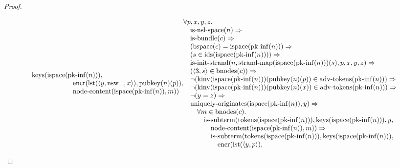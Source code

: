 \documentclass[11pt]{article}
\theoremstyle{plain}
\begin{document}
\begin{proof}
\begin{itemize}[leftmargin=2.8em, itemsep=4pt, parsep=1pt]
\begin{itemize}[leftmargin=2.8em, itemsep=4pt, parsep=1pt]
\begin{equation*}
\begin{array}{@{}l@{}}
\operatorname{keys}(\operatorname{ispace}(\operatorname{pk\text{-}inf}(n))), \\ \quad \quad \quad \quad \quad \quad \operatorname{encr}(\operatorname{lst}(\langle y, \operatorname{nsw\_}, x \rangle), \operatorname{pubkey}(n)(p)), \\ \quad \quad \quad \quad \quad \quad \operatorname{node\text{-}content}(\operatorname{ispace}(\operatorname{pk\text{-}inf}(n)), m)) \end{array} \\
\begin{array}{@{}l@{}} \forall p, x, y, z. \\ \quad \operatorname{is\text{-}nsl\text{-}space}(n) \Rightarrow  \\ \quad \operatorname{is\text{-}bundle}(c) \Rightarrow  \\ \quad (\operatorname{bspace}(c) = \operatorname{ispace}(\operatorname{pk\text{-}inf}(n))) \Rightarrow  \\ \quad (s \in \operatorname{ids}(\operatorname{ispace}(\operatorname{pk\text{-}inf}(n)))) \Rightarrow  \\ \quad \operatorname{is\text{-}init\text{-}strand}(n, \operatorname{strand\text{-}map}(\operatorname{ispace}(\operatorname{pk\text{-}inf}(n)))(s), p, x, y, z) \Rightarrow  \\ \quad (\langle 3, s \rangle \in \operatorname{bnodes}(c)) \Rightarrow  \\ \quad \neg (\operatorname{kinv}(\operatorname{ispace}(\operatorname{pk\text{-}inf}(n)))(\operatorname{pubkey}(n)(p)) \in \operatorname{adv\text{-}tokens}(\operatorname{pk\text{-}inf}(n))) \Rightarrow  \\ \quad \neg (\operatorname{kinv}(\operatorname{ispace}(\operatorname{pk\text{-}inf}(n)))(\operatorname{pubkey}(n)(x)) \in \operatorname{adv\text{-}tokens}(\operatorname{pk\text{-}inf}(n))) \Rightarrow  \\ \quad \neg (y = z) \Rightarrow  \\ \quad \operatorname{uniquely\text{-}originates}(\operatorname{ispace}(\operatorname{pk\text{-}inf}(n)), y) \Rightarrow  \\ \quad \quad \forall m \in \operatorname{bnodes}(c). \\ \quad \quad \quad \operatorname{is\text{-}subterm}(\operatorname{tokens}(\operatorname{ispace}(\operatorname{pk\text{-}inf}(n))), \operatorname{keys}(\operatorname{ispace}(\operatorname{pk\text{-}inf}(n))), y, \\ \quad \quad \quad \quad \operatorname{node\text{-}content}(\operatorname{ispace}(\operatorname{pk\text{-}inf}(n)), m)) \Rightarrow \\ \quad \quad \quad \quad \operatorname{is\text{-}subterm}(\operatorname{tokens}(\operatorname{ispace}(\operatorname{pk\text{-}inf}(n))), \operatorname{keys}(\operatorname{ispace}(\operatorname{pk\text{-}inf}(n))), \\ \quad \quad \quad \quad \quad \operatorname{encr}(\operatorname{lst}(\langle y, p \rangle), 
\end{array}
\end{equation*}
\end{itemize}
\end{itemize}
\end{proof}
\end{document}
